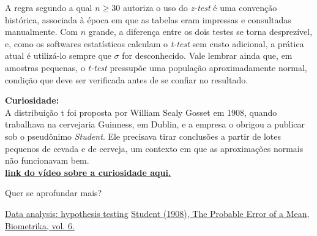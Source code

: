 {\subtitle{Uma ressalva importante}

\hspace*{1.5em}
A regra segundo a qual $n \geq 30$ autoriza o uso do \textit{z-test} é uma convenção histórica,
associada à época em que as tabelas eram impressas e consultadas manualmente.
Com $n$ grande, a diferença entre os dois testes se torna desprezível,
e, como os softwares estatísticos calculam o \textit{t-test} sem custo adicional,
a prática atual é utilizá-lo sempre que $\sigma$ for desconhecido.
Vale lembrar ainda que, em amostras pequenas, o \textit{t-test} pressupõe uma população aproximadamente normal,
condição que deve ser verificada antes de se confiar no resultado.

\begin{infobox}
\textbf{Curiosidade:}\\
A distribuição t foi proposta por William Sealy Gosset em 1908,
quando trabalhava na cervejaria Guinness, em Dublin,
e a empresa o obrigou a publicar sob o pseudônimo \textit{Student}.
Ele precisava tirar conclusões a partir de lotes pequenos de cevada e de cerveja,
um contexto em que as aproximações normais não funcionavam bem.\\
\textbf{\href{https://www.instagram.com/p/Dexi6WNFQJu/}{link do vídeo sobre a curiosidade aqui.}}
\end{infobox}

\vspace{0.1em}
{\color{HypePurple2} Quer se aprofundar mais?}

\href{https://www.open.edu/openlearn/science-maths-technology/data-analysis-hypothesis-testing/content-section-6.1}{Data analysis: hypothesis testing}
\href{https://www.jstor.org/stable/2331554?origin=crossref}{Student (1908), The Probable Error of a Mean, Biometrika, vol. 6.}

}
